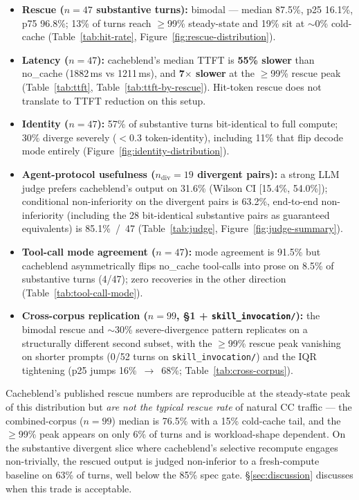 \begin{itemize}
\item \textbf{Rescue ($n{=}47$ substantive turns):} bimodal --- median
  87.5\%, p25 16.1\%, p75 96.8\%; 13\% of turns reach $\geq$99\%
  steady-state and 19\% sit at $\sim$0\% cold-cache
  (Table~\ref{tab:hit-rate}, Figure~\ref{fig:rescue-distribution}).
\item \textbf{Latency ($n{=}47$):} cacheblend's median TTFT is
  \textbf{55\% slower} than no\_cache (1882\,ms vs 1211\,ms), and
  \textbf{7$\times$ slower} at the $\geq$99\% rescue peak
  (Table~\ref{tab:ttft}, Table~\ref{tab:ttft-by-rescue}). Hit-token
  rescue does not translate to TTFT reduction on this setup.
\item \textbf{Identity ($n{=}47$):} 57\% of substantive turns bit-identical
  to full compute; 30\% diverge severely ($<$0.3 token-identity),
  including 11\% that flip decode mode entirely
  (Figure~\ref{fig:identity-distribution}).
\item \textbf{Agent-protocol usefulness ($n_{\text{div}}{=}19$ divergent
  pairs):} a strong LLM judge prefers cacheblend's output on 31.6\%
  (Wilson CI [15.4\%, 54.0\%]); conditional non-inferiority on the
  divergent pairs is 63.2\%, end-to-end non-inferiority (including the
  28 bit-identical substantive pairs as guaranteed equivalents) is
  85.1\%~/~47 (Table~\ref{tab:judge}, Figure~\ref{fig:judge-summary}).
\item \textbf{Tool-call mode agreement ($n{=}47$):} mode agreement is
  91.5\% but cacheblend asymmetrically flips no\_cache tool-calls into
  prose on 8.5\% of substantive turns (4/47); zero recoveries in the
  other direction (Table~\ref{tab:tool-call-mode}).
\item \textbf{Cross-corpus replication ($n{=}99$, §1 + \texttt{skill\_invocation/}):}
  the bimodal rescue and $\sim$30\% severe-divergence pattern replicates
  on a structurally different second subset, with the $\geq$99\% rescue
  peak vanishing on shorter prompts (0/52 turns on
  \texttt{skill\_invocation/}) and the IQR tightening (p25 jumps
  16\%~$\to$~68\%; Table~\ref{tab:cross-corpus}).
\end{itemize}

Cacheblend's published rescue numbers are reproducible at the
steady-state peak of this distribution but \emph{are not the typical
rescue rate} of natural CC traffic --- the combined-corpus
($n{=}99$) median is 76.5\% with a 15\% cold-cache tail, and the
$\geq$99\% peak appears on only 6\% of turns and is workload-shape
dependent. On the substantive divergent slice where cacheblend's
selective recompute engages non-trivially, the rescued output is
judged non-inferior to a fresh-compute baseline on 63\% of turns,
well below the 85\% spec gate.
\S\ref{sec:discussion} discusses when this trade is acceptable.
